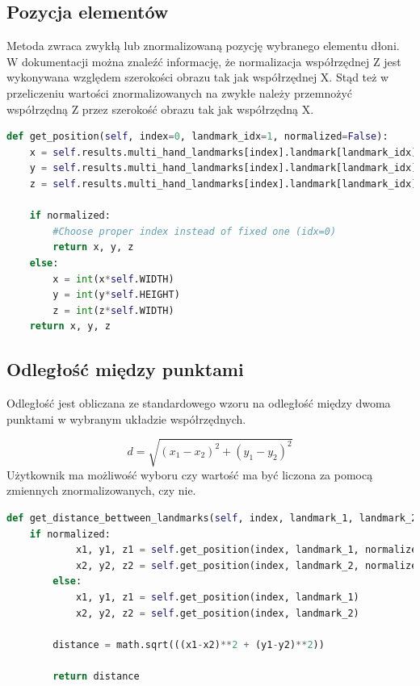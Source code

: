\subsection{Pozycja elementów}

\quad Metoda zwraca zwykłą lub znormalizowaną pozycję wybranego elementu dłoni. W dokumentacji można znaleźć informację, że normalizacja współrzędnej Z jest wykonywana względem szerokości obrazu tak jak współrzędnej X. Stąd też w przeliczeniu wartości znormalizowanych na zwykłe należy przemnożyć współrzędną Z przez szerokość obrazu tak jak współrzędną X. \newline

\begin{lstlisting}[language=python, style=programming, captionpos=b, caption={Pobranie pozycji}]
def get_position(self, index=0, landmark_idx=1, normalized=False):
    x = self.results.multi_hand_landmarks[index].landmark[landmark_idx].x
    y = self.results.multi_hand_landmarks[index].landmark[landmark_idx].y
    z = self.results.multi_hand_landmarks[index].landmark[landmark_idx].y

    if normalized:
        #Choose proper index instead of fixed one (idx=0)
        return x, y, z
    else:
        x = int(x*self.WIDTH)
        y = int(y*self.HEIGHT)
        z = int(z*self.WIDTH)
    return x, y, z
\end{lstlisting}

\subsection{Odległość między punktami}

\quad Odległość jest obliczana ze standardowego wzoru na odległość między dwoma punktami w wybranym układzie współrzędnych. 

\begin{equation}
    d = \sqrt{(x_1-x_2)^2 + (y_1-y_2)^2}
\end{equation}\newline
\quad Użytkownik ma możliwość wyboru czy wartość ma być liczona za pomocą zmiennych znormalizowanych, czy nie.  \newline

\begin{lstlisting}[language=python, style=programming, captionpos=b, caption={Obliczenie pozycji punktu charakterystycznego}]
def get_distance_bettween_landmarks(self, index, landmark_1, landmark_2, normalized=True):
    if normalized:
            x1, y1, z1 = self.get_position(index, landmark_1, normalized=True)
            x2, y2, z2 = self.get_position(index, landmark_2, normalized=True)
        else:
            x1, y1, z1 = self.get_position(index, landmark_1)
            x2, y2, z2 = self.get_position(index, landmark_2)

        distance = math.sqrt(((x1-x2)**2 + (y1-y2)**2))

        return distance
\end{lstlisting}

